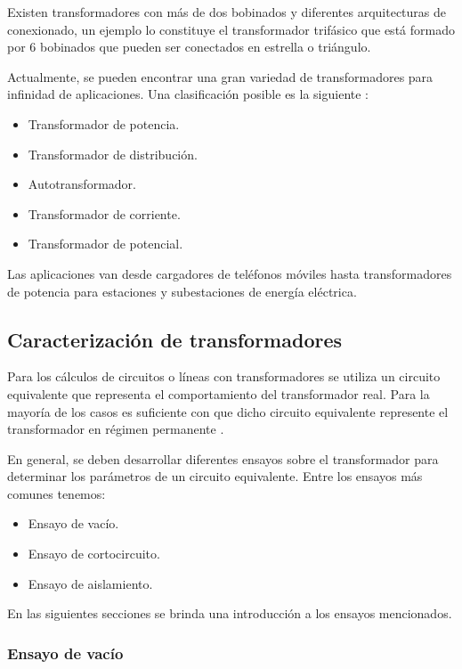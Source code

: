 
Existen transformadores con más de dos bobinados y diferentes arquitecturas de conexionado, un ejemplo lo constituye el transformador trifásico que está formado por 6 bobinados que pueden ser conectados en estrella o triángulo.

Actualmente, se pueden encontrar una gran variedad de transformadores para infinidad de aplicaciones. Una clasificación posible es la siguiente \citep{TRAFO_APL}:

\begin{itemize}
\item Transformador de potencia.
\item Transformador de distribución.
\item Autotransformador.
\item Transformador de corriente.
\item Transformador de potencial.
\end{itemize}

Las aplicaciones van desde cargadores de teléfonos móviles hasta transformadores de potencia para estaciones y subestaciones de energía eléctrica.

\subsection{Caracterización de transformadores}

Para los cálculos de circuitos o líneas con transformadores se utiliza un circuito equivalente que representa el comportamiento del transformador real. Para la mayoría de los casos es suficiente con que dicho circuito equivalente represente el transformador en régimen permanente \citep{TRAFO_WIKI}. 

En general, se deben desarrollar diferentes ensayos sobre el transformador para determinar los parámetros de un circuito equivalente. Entre los ensayos más comunes tenemos:

\begin{itemize}
\item Ensayo de vacío.
\item Ensayo de cortocircuito.
\item Ensayo de aislamiento.
\end{itemize}

En las siguientes secciones se brinda una introducción a los ensayos mencionados.

\subsubsection{Ensayo de vacío}

